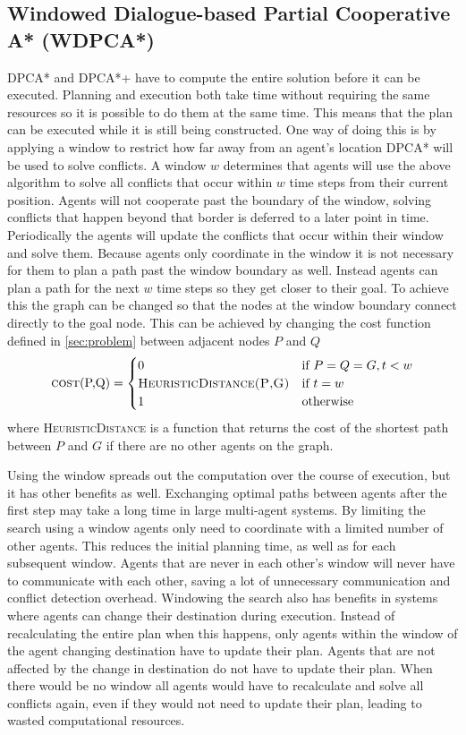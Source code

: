 \subsection{Windowed Dialogue-based Partial Cooperative A* (WDPCA*)}
DPCA* and DPCA*+ have to compute the entire solution before it can be executed.
Planning and execution both take time
without requiring the same resources so it is possible to do them at the
same time. This means that the plan can be executed while it is still being
constructed. One way of doing this is by applying a window to restrict how far
away from an agent's location DPCA* will be used to solve conflicts. A
window $w$ determines that agents will use the above algorithm to solve all
conflicts that occur within $w$ time steps from their current position. Agents
will not cooperate past the boundary of the window, solving conflicts that
happen beyond that border is deferred to a later point in time. Periodically
the agents will update the conflicts that occur within their window and solve 
them.
Because agents only coordinate in the window it is not necessary for them to
plan a path past the window boundary as well. Instead agents can plan a path
for the next $w$ time steps so they get closer to their goal. To achieve this
the graph can be changed so that the nodes at the window boundary connect
directly to the goal node. This can be achieved by changing the cost function
defined in \autoref{sec:problem} between adjacent nodes $P$ and $Q$
\cite{silver2005}
\[
\text{\textsc{cost}(P,Q)} =
\begin{cases}
    0 & \text{if } P = Q = G, t < w \\
    \textsc{HeuristicDistance(P,G)} & \text{if } t = w \\
    1 & \text{otherwise}
\end{cases}
\]
where \textsc{HeuristicDistance} is a function that returns the cost of the
shortest path between $P$ and $G$ if there are no other agents on the graph.

Using the window spreads out the computation over the course of execution, but
it has other benefits as well. Exchanging optimal paths between agents after
the first step may take a long time in large multi-agent systems.
By limiting the search using a window agents only need to coordinate with a
limited number of other agents. This reduces
the initial planning time, as well as for each subsequent window. Agents that
are never in each other's window will never have to communicate with each other,
saving a lot of unnecessary communication and conflict detection overhead.
Windowing the search also has benefits in systems where agents can change their
destination during execution. Instead of recalculating the entire plan when
this happens, only agents within the window of the agent changing destination
have to update their plan. Agents that are not affected by the change in
destination do not have to update their plan. When there would be no window all
agents would have to recalculate and solve all conflicts again, even if they
would not need to update their plan, leading to wasted computational resources.

